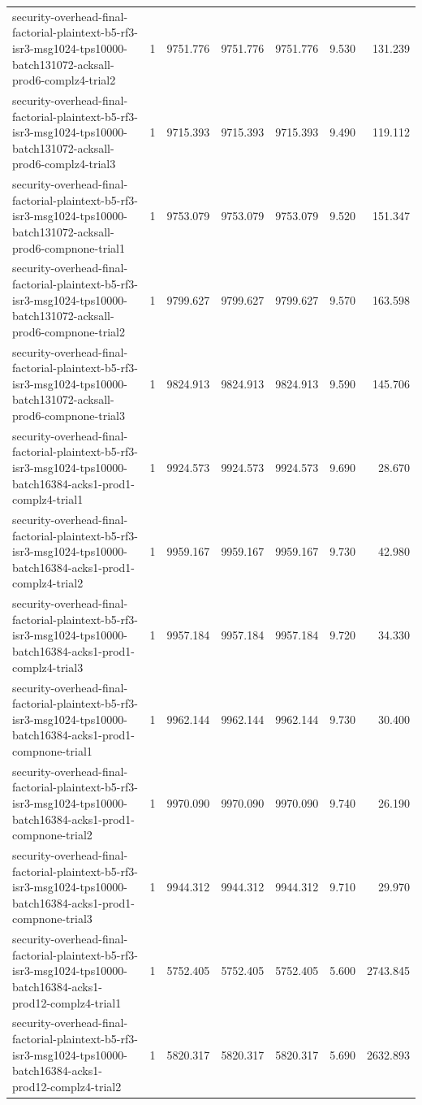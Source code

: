 \begin{tabular}{lrrrrrr}
security-overhead-final-factorial-plaintext-b5-rf3-isr3-msg1024-tps10000-batch131072-acksall-prod6-complz4-trial2 & 1 & 9751.776 & 9751.776 & 9751.776 & 9.530 & 131.239 \\
security-overhead-final-factorial-plaintext-b5-rf3-isr3-msg1024-tps10000-batch131072-acksall-prod6-complz4-trial3 & 1 & 9715.393 & 9715.393 & 9715.393 & 9.490 & 119.112 \\
security-overhead-final-factorial-plaintext-b5-rf3-isr3-msg1024-tps10000-batch131072-acksall-prod6-compnone-trial1 & 1 & 9753.079 & 9753.079 & 9753.079 & 9.520 & 151.347 \\
security-overhead-final-factorial-plaintext-b5-rf3-isr3-msg1024-tps10000-batch131072-acksall-prod6-compnone-trial2 & 1 & 9799.627 & 9799.627 & 9799.627 & 9.570 & 163.598 \\
security-overhead-final-factorial-plaintext-b5-rf3-isr3-msg1024-tps10000-batch131072-acksall-prod6-compnone-trial3 & 1 & 9824.913 & 9824.913 & 9824.913 & 9.590 & 145.706 \\
security-overhead-final-factorial-plaintext-b5-rf3-isr3-msg1024-tps10000-batch16384-acks1-prod1-complz4-trial1 & 1 & 9924.573 & 9924.573 & 9924.573 & 9.690 & 28.670 \\
security-overhead-final-factorial-plaintext-b5-rf3-isr3-msg1024-tps10000-batch16384-acks1-prod1-complz4-trial2 & 1 & 9959.167 & 9959.167 & 9959.167 & 9.730 & 42.980 \\
security-overhead-final-factorial-plaintext-b5-rf3-isr3-msg1024-tps10000-batch16384-acks1-prod1-complz4-trial3 & 1 & 9957.184 & 9957.184 & 9957.184 & 9.720 & 34.330 \\
security-overhead-final-factorial-plaintext-b5-rf3-isr3-msg1024-tps10000-batch16384-acks1-prod1-compnone-trial1 & 1 & 9962.144 & 9962.144 & 9962.144 & 9.730 & 30.400 \\
security-overhead-final-factorial-plaintext-b5-rf3-isr3-msg1024-tps10000-batch16384-acks1-prod1-compnone-trial2 & 1 & 9970.090 & 9970.090 & 9970.090 & 9.740 & 26.190 \\
security-overhead-final-factorial-plaintext-b5-rf3-isr3-msg1024-tps10000-batch16384-acks1-prod1-compnone-trial3 & 1 & 9944.312 & 9944.312 & 9944.312 & 9.710 & 29.970 \\
security-overhead-final-factorial-plaintext-b5-rf3-isr3-msg1024-tps10000-batch16384-acks1-prod12-complz4-trial1 & 1 & 5752.405 & 5752.405 & 5752.405 & 5.600 & 2743.845 \\
security-overhead-final-factorial-plaintext-b5-rf3-isr3-msg1024-tps10000-batch16384-acks1-prod12-complz4-trial2 & 1 & 5820.317 & 5820.317 & 5820.317 & 5.690 & 2632.893 \\

\end{tabular}
